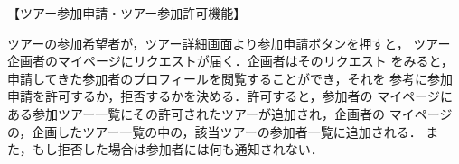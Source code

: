 【ツアー参加申請・ツアー参加許可機能】
\par
ツアーの参加希望者が，ツアー詳細画面より参加申請ボタンを押すと，
ツアー企画者のマイページにリクエストが届く．企画者はそのリクエスト
をみると，申請してきた参加者のプロフィールを閲覧することができ，それを
参考に参加申請を許可するか，拒否するかを決める．許可すると，参加者の
マイページにある参加ツアー一覧にその許可されたツアーが追加され，企画者の
マイページの，企画したツアー一覧の中の，該当ツアーの参加者一覧に追加される．
また，もし拒否した場合は参加者には何も通知されない．
